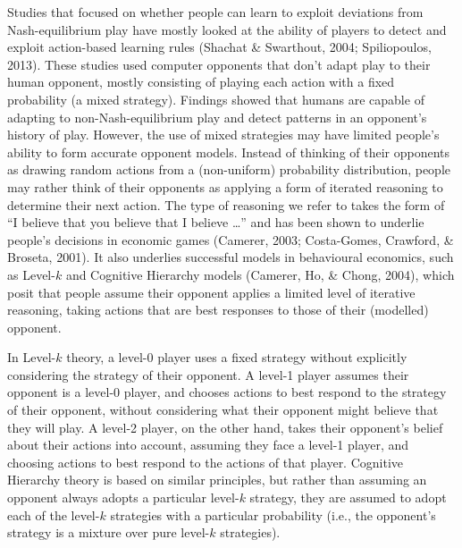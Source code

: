 \documentclass[english,man,floatsintext]{apa6}
\begin{document}
Studies that focused on whether people can learn to exploit deviations from Nash-equilibrium play have mostly looked at the ability of players to detect and exploit action-based learning rules (Shachat \& Swarthout, 2004; Spiliopoulos, 2013). These studies used computer opponents that don't adapt play to their human opponent, mostly consisting of playing each action with a fixed probability (a mixed strategy). Findings showed that humans are capable of adapting to non-Nash-equilibrium play and detect patterns in an opponent's history of play. However, the use of mixed strategies may have limited people's ability to form accurate opponent models.
Instead of thinking of their opponents as drawing random actions from a (non-uniform) probability distribution, people may rather think of their opponents as applying a form of iterated reasoning to determine their next action. The type of reasoning we refer to takes the form of \enquote{I believe that you believe that I believe \ldots{}} and has been shown to underlie people's decisions in economic games (Camerer, 2003; Costa-Gomes, Crawford, \& Broseta, 2001). It also underlies successful models in behavioural economics, such as Level-\(k\) and Cognitive Hierarchy models (Camerer, Ho, \& Chong, 2004), which posit that people assume their opponent applies a limited level of iterative reasoning, taking actions that are best responses to those of their (modelled) opponent.

In Level-\(k\) theory, a level-0 player uses a fixed strategy without explicitly considering the strategy of their opponent. A level-1 player assumes their opponent is a level-0 player, and chooses actions to best respond to the strategy of their opponent, without considering what their opponent might believe that they will play. A level-2 player, on the other hand, takes their opponent's belief about their actions into account, assuming they face a level-1 player, and choosing actions to best respond to the actions of that player. Cognitive Hierarchy theory is based on similar principles, but rather than assuming an opponent always adopts a particular level-\(k\) strategy, they are assumed to adopt each of the level-\(k\) strategies with a particular probability (i.e., the opponent's strategy is a mixture over pure level-\(k\) strategies).
\end{document}
